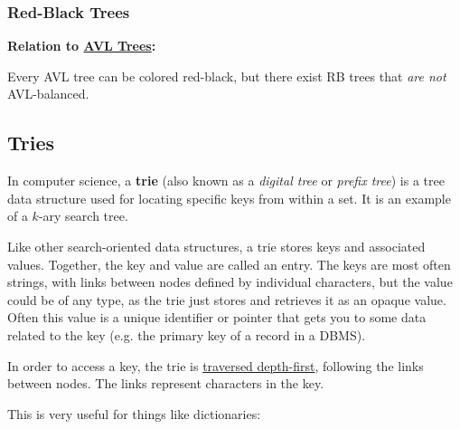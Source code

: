 \documentclass[12pt]{article}
\newcommand{\vspp}{\vspace{1.5mm}}
\begin{document}
	\subsubsection*{Red-Black Trees}
	\label{sec:RB}
	
	\noindent\textbf{Relation to \hyperref[sec:AVL]{AVL Trees}:} 
	
	Every AVL tree can be colored red-black, but there exist RB trees that \emph{are not} AVL-balanced.\vspp
	
	\red{\lipsum[1]}
	
	\subsection*{Tries}
	
	In computer science, a \textbf{trie} (also known as a \emph{digital tree} or \emph{prefix tree}) is a tree data structure used for locating specific keys from within a set. It is an example of a $k$-ary search tree.
	
	Like other search-oriented data structures, a trie stores keys and associated values. Together, the key and value are called an entry. The keys are most often strings, with links between nodes defined by individual characters, but the value could be of any type, as the trie just stores and retrieves it as an opaque value. Often this value is a unique identifier or pointer that gets you to some data related to the key (e.g. the primary key of a record in a DBMS).
	
	In order to access a key, the trie is \ul{traversed depth-first}, following the links between nodes. The links represent characters in the key.
	
	This is very useful for things like dictionaries:
	
\end{document}
